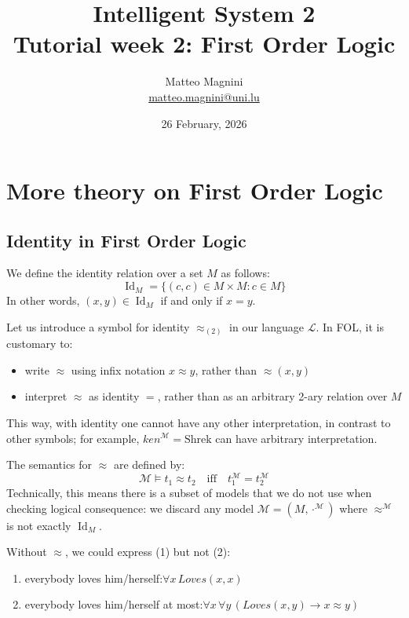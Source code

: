 \documentclass[11pt]{article}
\title{
    Intelligent System 2\\
    Tutorial week 2: First Order Logic
}
\author{
    Matteo Magnini\\
    \href{mailto:matteo.magnini@uni.lu}{matteo.magnini@uni.lu}
}
\date{
    26 February, 2026
}
\begin{document}
    \maketitle

    \section{More theory on First Order Logic}\label{sec:more-theory-on-first-order-logic}
    
    \subsection{Identity in First Order Logic}\label{subsec:identity-in-first-order-logic}

    We define the identity relation over a set $M$ as follows:
    \[
    \operatorname{Id}_M = \{(c, c) \in M \times M : c \in M\}
    \]
    In other words, $(x, y) \in \operatorname{Id}_M$ if and only if $x = y$.

    Let us introduce a symbol for identity $\approx_{(2)}$ in our language $\mathcal{L}$.
    In \ac{FOL}, it is customary to:
    \begin{itemize}
        \item write $\approx$ using infix notation $x \approx y$, rather than $\approx(x, y)$
        \item interpret $\approx$ as identity $=$, rather than as an arbitrary 2-ary relation over $M$
    \end{itemize}
    This way, with identity one cannot have any other interpretation, in contrast to other symbols; for example, $ken^{\mathcal{M}} = \text{Shrek}$ can have arbitrary interpretation.

    The semantics for $\approx$ are defined by:
    \[
    \mathcal{M} \models t_1 \approx t_2 \quad \text{iff} \quad t_1^{\mathcal{M}} = t_2^{\mathcal{M}}
    \]
    Technically, this means there is a subset of models that we do not use when checking logical consequence: we discard any model $\mathcal{M} = (M, \cdot^{\mathcal{M}})$ where $\approx^{\mathcal{M}}$ is not exactly $\operatorname{Id}_M$.

    Without $\approx$, we could express (1) but not (2):
    \begin{enumerate}
        \item everybody loves him/herself:\quad $\forall x\, Loves(x, x)$
        \item everybody loves him/herself at most:\quad $\forall x\, \forall y\, (Loves(x, y) \rightarrow x \approx y)$
    \end{enumerate}
\end{document}
